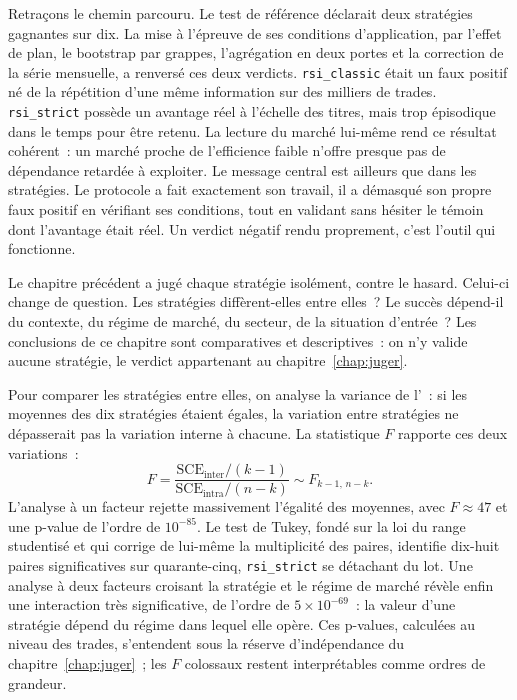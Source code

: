 Retraçons le chemin parcouru. Le test de référence déclarait deux
stratégies gagnantes sur dix. La mise à l'épreuve de ses conditions
d'application, par l'effet de plan, le bootstrap par grappes,
l'agrégation en deux portes et la correction de la série mensuelle, a
renversé ces deux verdicts. \texttt{rsi\_classic} était un faux positif
né de la répétition d'une même information sur des milliers de trades.
\texttt{rsi\_strict} possède un avantage réel à l'échelle des titres,
mais trop épisodique dans le temps pour être retenu. La lecture du
marché lui-même rend ce résultat cohérent~: un marché proche de
l'efficience faible n'offre presque pas de dépendance retardée à
exploiter. Le message central est ailleurs que dans les stratégies. Le
protocole a fait exactement son travail, il a démasqué son propre faux
positif en vérifiant ses conditions, tout en validant sans hésiter le
témoin dont l'avantage était réel. Un verdict négatif rendu proprement,
c'est l'outil qui fonctionne.




Le chapitre précédent a jugé chaque stratégie isolément, contre le
hasard. Celui-ci change de question. Les stratégies diffèrent-elles
entre elles~? Le succès dépend-il du contexte, du régime de marché, du
secteur, de la situation d'entrée~? Les conclusions de ce chapitre sont
comparatives et descriptives~: on n'y valide aucune stratégie, le
verdict appartenant au chapitre~\ref{chap:juger}.



Pour comparer les stratégies entre elles, on analyse la variance de
l'\edgevar{}~: si les moyennes des dix stratégies étaient égales, la
variation entre stratégies ne dépasserait pas la variation interne à
chacune. La statistique \(F\) rapporte ces deux variations~:
\[
  F = \frac{\mathrm{SCE}_{\text{inter}}/(k-1)}
           {\mathrm{SCE}_{\text{intra}}/(n-k)} \sim F_{k-1,\,n-k}.
\]
L'analyse à un facteur rejette massivement l'égalité des moyennes, avec
\(F\approx 47\) et une p-value de l'ordre de $10^{-85}$. Le test de
Tukey, fondé sur la loi du range studentisé et qui corrige de lui-même
la multiplicité des paires, identifie dix-huit paires significatives sur
quarante-cinq, \texttt{rsi\_strict} se détachant du lot. Une analyse à
deux facteurs croisant la stratégie et le régime de marché révèle enfin
une interaction très significative, de l'ordre de $5\times10^{-69}$~: la
valeur d'une stratégie dépend du régime dans lequel elle opère. Ces
p-values, calculées au niveau des trades, s'entendent sous la réserve
d'indépendance du chapitre~\ref{chap:juger}~; les \(F\) colossaux
restent interprétables comme ordres de grandeur.

